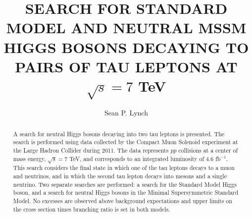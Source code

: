 \documentclass[textrefs,final,noinfo]{nddiss2e}
\begin{document}
\frontmatter

\title{SEARCH FOR STANDARD MODEL AND NEUTRAL MSSM HIGGS BOSONS DECAYING TO PAIRS OF TAU LEPTONS AT $\sqrt{s} = 7$ TeV}
\author{Sean P. Lynch}

\maketitle

\makecopyright


\begin{abstract}
A search for neutral Higgs bosons decaying into two tau leptons is presented. 
The search is performed using data collected by the Compact Muon Solenoid experiment at the Large Hadron Collider during 2011. 
The data represents $pp$ collisions at a center of mass energy, $\sqrt{s} = 7$ TeV, and corresponds to an integrated luminosity of $4.6$ fb$^{-1}$.
This search considers the final state in which one of the tau leptons decays to a muon and neutrinos, and in which the second tau lepton decays into mesons and a single neutrino.
Two separate searches are performed: a search for the Standard Model Higgs boson, and a search for neutral Higgs bosons in the Minimal Supersymmetric Standard Model.
No excesses are observed above background expectations and upper limits on the cross section times branching ratio is set in both models.
\end{abstract}

\tableofcontents
\listoffigures
\listoftables

\end{document}

